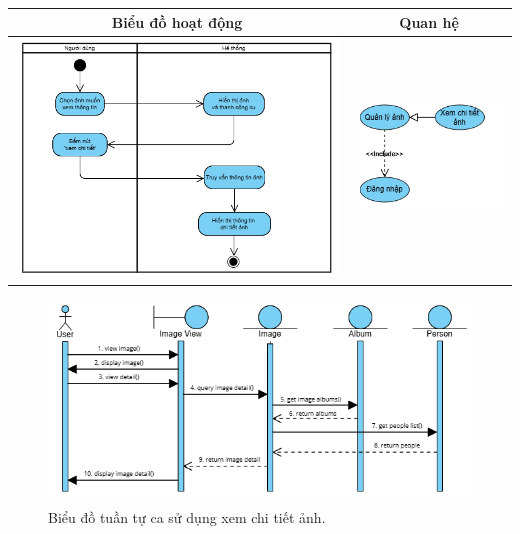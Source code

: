 \noindent 
\begin{tabular}{| c | c |}
    \hline
    \textbf{Biểu đồ hoạt động} & \textbf{Quan hệ} \\ 
    \hline
    \includegraphics[width=0.6\linewidth]{figures/c3/3-3-5-activity-diagram.png} 
    & 
    \includegraphics[width=0.35\linewidth]{figures/c3/3-3-5-relationship.png} \\ 
    \hline
\end{tabular}

\begin{figure}[H]
    \centering  
    \includegraphics[width=1\textwidth]{figures/c3/3-3-5-sequence-diagram.png}
    \caption{Biểu đồ tuần tự ca sử dụng xem chi tiết ảnh.}
    \label{fig:3-3-5-sequence-diagram}
\end{figure}
